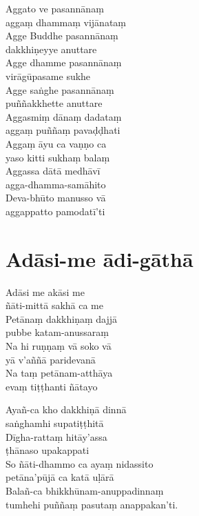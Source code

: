 \begin{paritta}
  Aggato ve pasannānaṃ\\\vin aggaṃ dhammaṃ vijānataṃ\\
  Agge Buddhe pasannānaṃ\\\vin dakkhiṇeyye anuttare\\
  Agge dhamme pasannānaṃ\\\vin virāgūpasame sukhe\\
  Agge saṅghe pasannānaṃ\\\vin puññakkhette anuttare\\
  Aggasmiṃ dānaṃ dadataṃ\\\vin aggaṃ puññaṃ pavaḍḍhati\\
  Aggaṃ āyu ca vaṇṇo ca\\\vin yaso kitti sukhaṃ balaṃ\\
  Aggassa dātā medhāvī\\\vin agga-dhamma-samāhito\\
  Deva-bhūto manusso vā\\\vin aggappatto pamodatī'ti 
\end{paritta}

\section{Adāsi-me ādi-gāthā}



\begin{paritta}
Adāsi me akāsi me\\\vin ñāti-mittā sakhā ca me\\
Petānaṃ dakkhiṇaṃ dajjā\\\vin pubbe katam-anussaraṃ\\
Na hi ruṇṇaṃ vā soko vā\\\vin yā v'aññā paridevanā\\
Na taṃ petānam-atthāya\\\vin evaṃ tiṭṭhanti ñātayo


Ayañ-ca kho dakkhiṇā dinnā\\\vin saṅghamhi supatiṭṭhitā\\
Dīgha-rattaṃ hitāy'assa\\\vin ṭhānaso upakappati\\
So ñāti-dhammo ca ayaṃ nidassito\\\vin petāna'pūjā ca katā uḷārā\\
Balañ-ca bhikkhūnam-anuppadinnaṃ\\\vin tumhehi puññaṃ pasutaṃ anappakan'ti.
\end{paritta}

